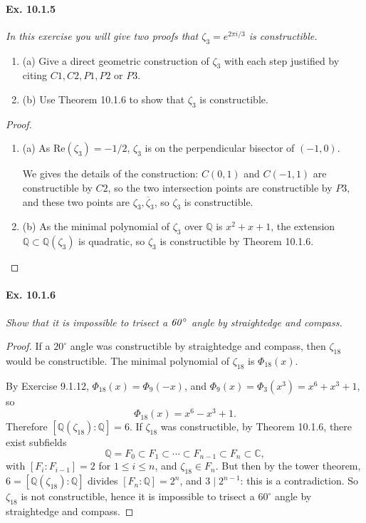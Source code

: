 \documentclass[11pt,a4paper]{article}
\newcommand{\be} {\begin{enumerate}}
\newcommand{\ee} {\end{enumerate}}
\newcommand{\Q}{\mathbb{Q}}
\newcommand{\C}{\mathbb{C}}
\begin{document}
\paragraph{Ex. 10.1.5}

{\it In this exercise you will give two proofs that $\zeta_3 = e^{2\pi i/3}$ is constructible.
\be
\item[(a)] Give a direct geometric construction of $\zeta_3$ with each step justified by citing $C1,C2,P1,P2$ or $P3$.
\item[(b)] Use Theorem 10.1.6 to show that $\zeta_3$ is constructible.
\ee
}

\begin{proof} 
\be
\item[(a)]
As $\mathrm{Re}(\zeta_3) = -1/2$, $\zeta_3$ is on the perpendicular bisector of $(-1,0)$.

We gives the details of the construction:
$C(0,1)$ and $C(-1,1)$ are constructible by $C2$, so the two intersection points are constructible by $P3$, and these two points are $\zeta_3,\overline{\zeta}_3$, so $\zeta_3$ is constructible.
\item[(b)] As the minimal polynomial of $\zeta_3$ over $\Q$ is $x^2+x+1$, the extension $\Q\subset \Q(\zeta_3)$ is quadratic, so $\zeta_3$ is constructible by Theorem 10.1.6.
\ee
\end{proof}



\paragraph{Ex. 10.1.6}

{\it Show that it is impossible to trisect a $\it 60^{\circ}$ angle by straightedge and compass.
}

\begin{proof} If  a $20^{\circ}$ angle was constructible by straightedge and compass, then $\zeta_{18}$ would be constructible. The minimal polynomial of $\zeta_{18}$ is $\Phi_{18}(x)$.

By Exercise 9.1.12, $\Phi_{18}(x) = \Phi_9(-x)$, and $\Phi_9(x) = \Phi_3(x^3) = x^6 +x^3+1$, so
$$\Phi_{18}(x) = x^6-x^3+1.$$
Therefore $[\Q(\zeta_{18}) : \Q] = 6$. If $\zeta_{18}$ was constructible, by Theorem 10.1.6, there exist subfields 
$$\Q = F_0 \subset F_1\subset \cdots \subset F_{n-1}\subset F_n \subset \C,$$
with $[F_i:F_{i-1}] = 2$ for $1\leq i \leq n$, and $\zeta_{18} \in F_n$. But then by the tower theorem, $6 = [\Q(\zeta_{18}) : \Q] $ divides $[F_n : \Q] = 2^n$, and $3 \mid 2^{n-1}$: this is a contradiction. So $\zeta_{18}$ is not constructible, hence it is impossible to trisect a $60^{\circ}$ angle by straightedge and compass.
\end{proof}
\end{document}
